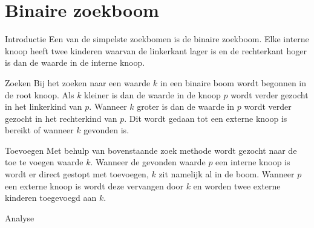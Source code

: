 \chapter{Binaire zoekboom}
\label{sec:Hoofdstuk 2}

Introductie
Een van de simpelste zoekbomen is de binaire zoekboom. Elke interne knoop heeft twee kinderen waarvan de linkerkant lager is en de rechterkant hoger is dan de waarde in de interne knoop.

Zoeken
Bij het zoeken naar een waarde $k$ in een binaire boom wordt begonnen in de root knoop. Als $k$ kleiner is dan de waarde in de knoop $p$ wordt verder gezocht in het linkerkind van $p$. Wanneer $k$ groter is dan de waarde in $p$ wordt verder gezocht in het rechterkind van $p$. Dit wordt gedaan tot een externe knoop is bereikt of wanneer $k$ gevonden is.

Toevoegen
Met behulp van bovenstaande zoek methode wordt gezocht naar de toe te voegen waarde $k$. Wanneer de gevonden waarde $p$ een interne knoop is wordt er direct gestopt met toevoegen, $k$ zit namelijk al in de boom. Wanneer $p$ een externe knoop is wordt deze vervangen door $k$ en worden twee externe kinderen toegevoegd aan $k$.

Analyse

